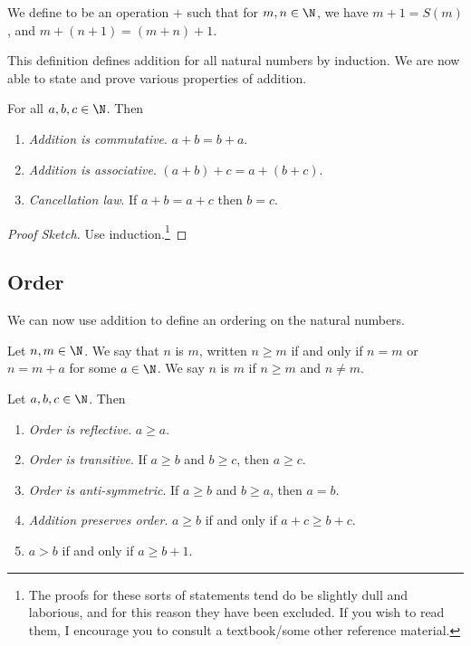 \documentclass[a4paper]{scrreprt}
\begin{document}
\begin{definition}[Addition]
	We define  to be an operation $+$ such that for $m, n \in \N$, we have $m + 1 = S(m)$, and $m + (n + 1) = (m + n) + 1$.
\end{definition}

This definition defines addition for all natural numbers by induction. We are now able to state and prove various properties of addition.

\begin{proposition}
	For all $a, b, c \in \N$. Then
	\begin{enumerate}[label=(\roman*)]
		\item \emph{Addition is commutative}. $a + b = b + a$.
		\item \emph{Addition is associative}. $(a + b) + c = a + (b + c)$. 
		\item \emph{Cancellation law}. If $a + b = a + c$ then $b = c$.
	\end{enumerate}
\end{proposition}
\begin{proof}[Proof Sketch]
	Use induction.\footnote{The proofs for these sorts of statements tend do be slightly dull and laborious, and for this reason they have been excluded. If you wish to read them, I encourage you to consult a textbook/some other reference material.}
\end{proof}

\subsection{Order}

We can now use addition to define an ordering on the natural numbers.

\begin{definition}
	Let $n, m \in \N$. We say that $n$ is  $m$, written $n \geq m$ if and only if $n = m$ or $n = m + a$ for some $a \in \N$. We say $n$ is  $m$ if $n \geq m$ and $n \neq m$.
\end{definition}

\begin{proposition}
	Let $a, b, c \in \N$. Then
	\begin{enumerate}[label=(\roman*)]
		\item \emph{Order is reflective}. $a \geq a$.
		\item \emph{Order is transitive}. If $a \geq b$ and $b \geq c$, then $a \geq c$.
		\item \emph{Order is anti-symmetric}. If $a \geq b$ and $b \geq a$, then $a = b$.
		\item \emph{Addition preserves order}. $a \geq b$ if and only if $a + c \geq b + c$.
		\item $a > b$ if and only if $a \geq b + 1$.
	\end{enumerate}
\end{proposition}
\end{document}
